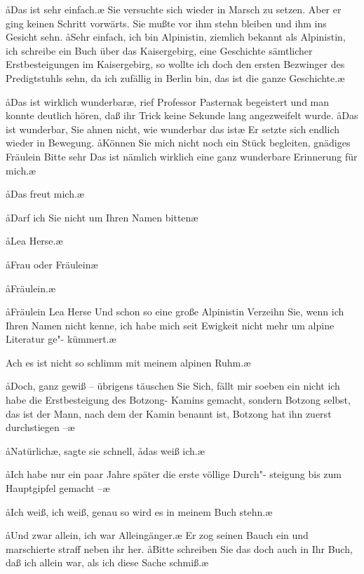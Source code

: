 \aa{}Das ist sehr einfach.\ae{}\eingriff{eS71-3}{einfach.\ae{} ] einfach\ae{}.} Sie versuchte sich wieder in Marsch zu
setzen. Aber er ging keinen Schritt vorwärts. Sie mußte vor
ihm stehn bleiben und ihm ins Gesicht sehn. \aa{}Sehr einfach,
ich bin Alpinistin, ziemlich bekannt als Alpinistin, ich schreibe
ein Buch über das Kaisergebirg, eine Geschichte sämtlicher
Erstbesteigungen im Kaisergebirg, so wollte ich doch den ersten
Bezwinger des Predigtstuhls sehn, da ich zufällig in Berlin
bin, das ist die ganze Geschichte.\ae{}

\aa{}Das ist wirklich wunderbar\ae{}, rief Professor Pasternak
begeistert und man konnte deutlich hören, daß ihr Trick keine
Sekunde lang angezweifelt wurde. \aa{}Das ist wunderbar,
Sie ahnen nicht, wie wunderbar das ist\ausr{}\ae{} Er setzte sich endlich
wieder in Bewegung. \aa{}Können Sie mich nicht noch ein Stück
begleiten, gnädiges Fräulein\frag{} Bitte sehr\ausr{} Das ist nämlich
wirklich eine ganz wunderbare Erinnerung für mich.\ae{}

\aa{}Das freut mich.\ae{}

\aa{}Darf ich Sie nicht um Ihren Namen bitten\frag{}\ae{}

\aa{}Lea Herse.\ae{}

\aa{}Frau oder Fräulein\frag{}\ae{}

\aa{}Fräulein.\ae{}

\aa{}Fräulein Lea Herse\ausr{} Und schon so eine große Alpinistin\frag{}
Verzeihn Sie, wenn ich Ihren Namen nicht kenne, ich
habe mich seit Ewigkeit nicht mehr um alpine Literatur ge"-%
kümmert.\ae{}

\aanah{}Ach es ist nicht so schlimm mit meinem alpinen Ruhm.\ae{}

\aa{}Doch, ganz gewiß -- übrigens täuschen Sie Sich\eingriff{eS72-1}{Sich ] sich}, fällt mir
soeben ein\dopp{} nicht ich habe die Erstbesteigung des Botzong-%
Kamins gemacht, sondern Botzong selbst, das ist der Mann,
nach dem der Kamin benannt ist, Botzong hat ihn zuerst
durchstiegen --\ae{}

\aa{}Natürlich\ae{}, sagte sie schnell, \aa{}das weiß ich.\ae{}

\aa{}Ich habe nur ein paar Jahre später die erste völlige Durch"-%
steigung bis zum Hauptgipfel gemacht --\ae{}

\aa{}Ich weiß, ich weiß, genau so wird es in meinem Buch
stehn.\ae{}

\aa{}Und zwar allein, ich war Alleingänger.\ae{} Er zog seinen Bauch
ein und marschierte straff neben ihr her. \aa{}Bitte schreiben Sie
das doch auch in Ihr Buch, daß ich allein war, als ich diese
Sache schmiß.\ae{}

